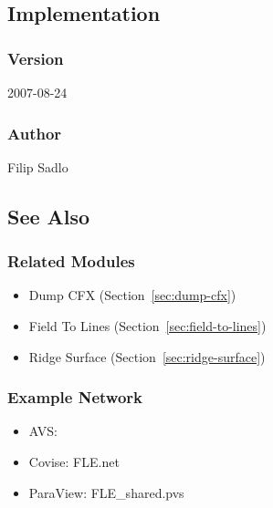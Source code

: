 \subsection{Implementation}


\subsubsection{Version}

2007-08-24


\subsubsection{Author}

Filip Sadlo


\subsection{See Also}


\subsubsection{Related Modules}

\begin{itemize}

\item
  Dump CFX (Section~\ref{sec:dump-cfx})
\item
  Field To Lines (Section~\ref{sec:field-to-lines})
\item
  Ridge Surface (Section~\ref{sec:ridge-surface})
\end{itemize}


\subsubsection{Example Network}

\begin{itemize}

\item
  AVS: 
\item
  Covise: FLE.net
\item
  ParaView: FLE\_shared.pvs

\end{itemize}
